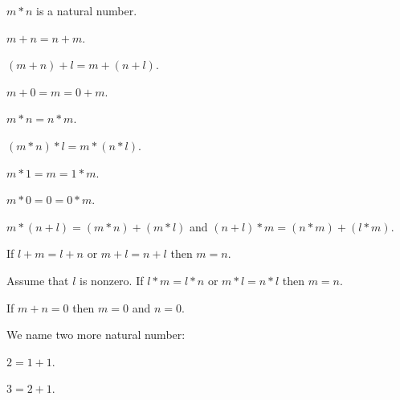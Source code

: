 \documentclass[11pt]{article}
\begin{document}
\begin{forthel}

\begin{signature}
$m * n$ is a natural number.
\end{signature}

\begin{axiom}
$m + n = n + m$.
\end{axiom}

\begin{axiom}
$(m + n) + l = m + (n + l)$.
\end{axiom}

\begin{axiom}
$m + 0 = m = 0 + m$.
\end{axiom}

\begin{axiom}
$m * n = n * m$.
\end{axiom}

\begin{axiom}
$(m * n) * l = m * (n * l)$.
\end{axiom}

\begin{axiom}
$m * 1 = m = 1 * m$.
\end{axiom}

\begin{axiom}
$m * 0 = 0 = 0 * m$.
\end{axiom}

\begin{axiom}
$m * (n + l) = (m * n) + (m * l)$ and
$(n + l) * m = (n * m) + (l * m)$.
\end{axiom}

\begin{axiom}
If $l + m = l + n$ or $m + l = n + l$ then $m = n$.
\end{axiom}

\begin{axiom}
Assume that $l$ is nonzero.
If $l * m = l * n$ or $m * l = n * l$ then $m = n$.
\end{axiom}

\begin{axiom}
If $m + n = 0$ then $m = 0$ and $n = 0$.
\end{axiom}

\end{forthel}

We name two more natural number:

\begin{forthel}

\begin{definition}
$2 = 1 + 1$.
\end{definition}

\begin{definition}
$3 = 2 + 1$.
\end{definition}

\end{forthel}
\end{document}
